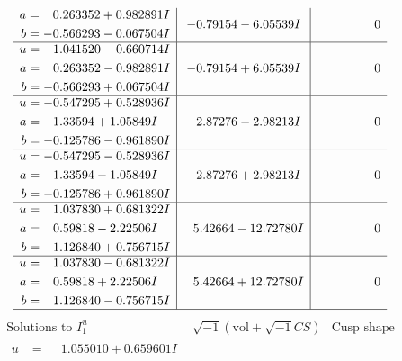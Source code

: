 \documentclass[1p]{elsarticle_modified}
\theoremstyle{definition}
\newcommand{\I}{\sqrt{-1}}
\begin{document}
$$\begin{array}{c|c|c}
\begin{aligned}
a &= \phantom{-}0.263352 + 0.982891 I \\
b &= -0.566293 - 0.067504 I\end{aligned}
 & -0.79154 - 6.05539 I & \phantom{-0.000000 } 0 \\ \hline\begin{aligned}
u &= \phantom{-}1.041520 - 0.660714 I \\
a &= \phantom{-}0.263352 - 0.982891 I \\
b &= -0.566293 + 0.067504 I\end{aligned}
 & -0.79154 + 6.05539 I & \phantom{-0.000000 } 0 \\ \hline\begin{aligned}
u &= -0.547295 + 0.528936 I \\
a &= \phantom{-}1.33594 + 1.05849 I \\
b &= -0.125786 - 0.961890 I\end{aligned}
 & \phantom{-}2.87276 - 2.98213 I & \phantom{-0.000000 } 0 \\ \hline\begin{aligned}
u &= -0.547295 - 0.528936 I \\
a &= \phantom{-}1.33594 - 1.05849 I \\
b &= -0.125786 + 0.961890 I\end{aligned}
 & \phantom{-}2.87276 + 2.98213 I & \phantom{-0.000000 } 0 \\ \hline\begin{aligned}
u &= \phantom{-}1.037830 + 0.681322 I \\
a &= \phantom{-}0.59818 - 2.22506 I \\
b &= \phantom{-}1.126840 + 0.756715 I\end{aligned}
 & \phantom{-}5.42664 - 12.72780 I & \phantom{-0.000000 } 0 \\ \hline\begin{aligned}
u &= \phantom{-}1.037830 - 0.681322 I \\
a &= \phantom{-}0.59818 + 2.22506 I \\
b &= \phantom{-}1.126840 - 0.756715 I\end{aligned}
 & \phantom{-}5.42664 + 12.72780 I & \phantom{-0.000000 } 0\\
 \hline 
 \end{array}$$\newpage$$\begin{array}{c|c|c}  
\text{Solutions to }I^u_{1}& \I (\text{vol} + \sqrt{-1}CS) & \text{Cusp shape}\\
 \hline 
\begin{aligned}
u &= \phantom{-}1.055010 + 0.659601 I \\

\end{aligned}
\end{array}$$
\end{document}
